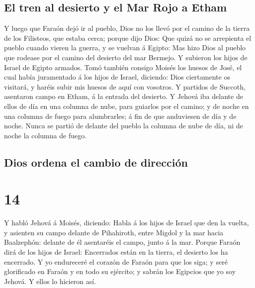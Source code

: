 \hypertarget{el-tren-al-desierto-y-el-mar-rojo-a-etham}{%
\subsection{El tren al desierto y el Mar Rojo a
Etham}\label{el-tren-al-desierto-y-el-mar-rojo-a-etham}}

 Y luego que Faraón dejó ir al pueblo, Dios no los llevó
por el camino de la tierra de los Filisteos, que estaba cerca; porque
dijo Dios: Que quizá no se arrepienta el pueblo cuando vieren la guerra,
y se vuelvan á Egipto:  Mas hizo Dios al pueblo que
rodease por el camino del desierto del mar Bermejo. Y subieron los hijos
de Israel de Egipto armados.  Tomó también consigo Moisés
los huesos de José, el cual había juramentado á los hijos de Israel,
diciendo: Dios ciertamente os visitará, y haréis subir mis huesos de
aquí con vosotros.  Y partidos de Succoth, asentaron
campo en Etham, á la entrada del desierto.  Y Jehová iba
delante de ellos de día en una columna de nube, para guiarlos por el
camino; y de noche en una columna de fuego para alumbrarles; á fin de
que anduviesen de día y de noche.  Nunca se partió de
delante del pueblo la columna de nube de día, ni de noche la columna de
fuego.

\hypertarget{dios-ordena-el-cambio-de-direcciuxf3n}{%
\subsection{Dios ordena el cambio de
dirección}\label{dios-ordena-el-cambio-de-direcciuxf3n}}

\hypertarget{section-13}{%
\section{14}\label{section-13}}

 Y habló Jehová á Moisés, diciendo:  Habla á
los hijos de Israel que den la vuelta, y asienten su campo delante de
Pihahiroth, entre Migdol y la mar hacia Baalzephón: delante de él
asentaréis el campo, junto á la mar.  Porque Faraón dirá
de los hijos de Israel: Encerrados están en la tierra, el desierto los
ha encerrado.  Y yo endureceré el corazón de Faraón para
que los siga; y seré glorificado en Faraón y en todo su ejército; y
sabrán los Egipcios que yo soy Jehová. Y ellos lo hicieron así.

